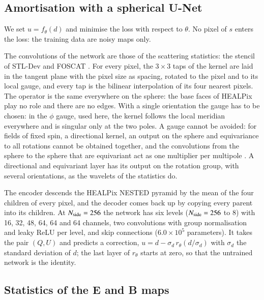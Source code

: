 \documentclass{aa}
\newcommand{\nside}{N_{\rm side}}
\begin{document}
\subsection{Amortisation with a spherical U-Net}\label{sec:unet}

We set $u=f_\theta(d)$ and minimise the loss with respect to $\theta$. No pixel of $s$ enters the loss: the training data are noisy maps only.

The convolutions of the network are those of the scattering statistics: the stencil of STL-Dev and FOSCAT \citep{stldev,foscat}. For every pixel, the $3\times3$ taps of the kernel are laid in the tangent plane with the pixel size as spacing, rotated to the pixel and to its local gauge, and every tap is the bilinear interpolation of its four nearest pixels. The operator is the same everywhere on the sphere: the base faces of HEALPix play no role and there are no edges. With a single orientation the gauge has to be chosen: in the $\phi$ gauge, used here, the kernel follows the local meridian everywhere and is singular only at the two poles. A gauge cannot be avoided: for fields of fixed spin, a directional kernel, an output on the sphere and equivariance to all rotations cannot be obtained together, and the convolutions from the sphere to the sphere that are equivariant act as one multiplier per multipole \citep{mcewen2026}. A directional and equivariant layer has its output on the rotation group, with several orientations, as the wavelets of the statistics do.

The encoder descends the HEALPix NESTED pyramid by the mean of the four children of every pixel, and the decoder comes back up by copying every parent into its children. At $\nside=256$ the network has six levels ($\nside=256$ to 8) with 16, 32, 48, 64, 64 and 64 channels, two convolutions with group normalisation and leaky ReLU per level, and skip connections ($6.0\times10^5$ parameters). It takes the pair $(Q,U)$ and predicts a correction, $u=d-\sigma_d\,r_\theta(d/\sigma_d)$ with $\sigma_d$ the standard deviation of $d$; the last layer of $r_\theta$ starts at zero, so that the untrained network is the identity.

\subsection{Statistics of the E and B maps}\label{sec:eb}
\end{document}
